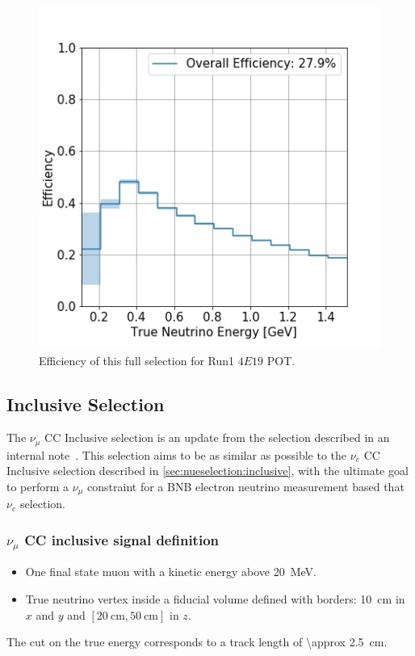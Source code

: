 \begin{figure}
    \centering
    \includegraphics[scale=0.5]{NuMuCCsel/Images/Ryan/finalEfficiency.jpg}
    \caption{Efficiency of this full selection for Run1 $4E19$ POT.}
    \label{fig:NuMUCCsel:ryan:Run1Efficiency}
\end{figure}

\clearpage

\subsection{Inclusive Selection}
\label{ssec:NuMUCCsel:INC}
The $\nu_\mu$ CC Inclusive selection is an update from the selection described in an internal note~\cite{bib:numuccfilter}. This selection aims to be as similar as possible to the $\nu_e$ CC Inclusive selection described in \cref{sec:nueselection:inclusive}, with the ultimate goal to perform a $\nu_\mu$ constraint for a BNB electron neutrino measurement  based that $\nu_e$ selection. 

\subsubsection{$\nu_\mu$ CC inclusive signal definition}
\begin{itemize}
    \item One final state muon with a kinetic energy above \SI{20}{\MeV}.
    \item True neutrino vertex inside a fiducial volume defined with borders: \SI{10}{\cm} in $x$ and $y$ and $[ \SI{20}{\cm}, \SI{50}{\cm}]$ in $z$.
\end{itemize}
The cut on the true energy corresponds to a track length of \SI{\approx 2.5}{\cm}.

